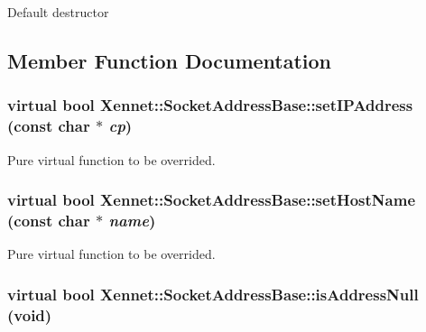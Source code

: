 Default destructor 

\subsection{Member Function Documentation}
\hypertarget{classXennet_1_1SocketAddressBase_414d94208d01e7a3edefc1df75ac1e42}{
\subsubsection{\setlength{\rightskip}{0pt plus 5cm}virtual bool Xennet::SocketAddressBase::setIPAddress (const char $\ast$ {\em cp})}}
\label{classXennet_1_1SocketAddressBase_414d94208d01e7a3edefc1df75ac1e42}


Pure virtual function to be overrided. 

\hypertarget{classXennet_1_1SocketAddressBase_d5b5f60871399f28a02aa8bdf6544e42}{
\subsubsection{\setlength{\rightskip}{0pt plus 5cm}virtual bool Xennet::SocketAddressBase::setHostName (const char $\ast$ {\em name})}}
\label{classXennet_1_1SocketAddressBase_d5b5f60871399f28a02aa8bdf6544e42}


Pure virtual function to be overrided. 

\hypertarget{classXennet_1_1SocketAddressBase_5d6eb8b8a0218b1bc59b63c16ad82423}{
\subsubsection{\setlength{\rightskip}{0pt plus 5cm}virtual bool Xennet::SocketAddressBase::isAddressNull (void)}}
\label{classXennet_1_1SocketAddressBase_5d6eb8b8a0218b1bc59b63c16ad82423}


